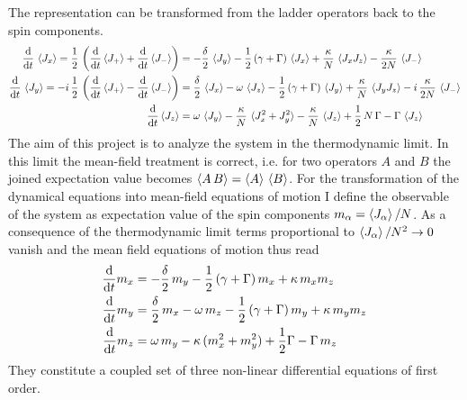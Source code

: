 The representation can be transformed from the ladder operators back to the spin components.
\begin{align*}
    \frac{\text{d}}{\text{d}t}\,\braket{J_x}=\frac{1}{2}\,\left(\frac{\text{d}}{\text{d}t} \braket{J_+}+\frac{\text{d}}{\text{d}t} \braket{J_-}\right)&=-\frac{\delta}{2}\,\braket{J_y}-\frac{1}{2}\,(\gamma+\Gamma)\,\braket{J_x}+\frac{\kappa}{N}\,\braket{J_xJ_z}-\frac{\kappa}{2N}\,\braket{J_-}\\
    \frac{\text{d}}{\text{d}t}\,\braket{J_y}=-i\,\frac{1}{2}\,\left(\frac{\text{d}}{\text{d}t} \braket{J_+}-\frac{\text{d}}{\text{d}t} \braket{J_-}\right)&=\frac{\delta}{2}\,\braket{J_x}-\omega\,\braket{J_z}-\frac{1}{2}\,(\gamma+\Gamma)\,\braket{J_y}+\frac{\kappa}{N}\,\braket{J_yJ_z}-i\,\frac{\kappa}{2N}\,\braket{J_-}\\
    \frac{\text{d}}{\text{d}t} \braket{J_z}&=\omega\,\braket{J_y} - \frac{\kappa}{N}\,\braket{J_x^2+J_y^2} -\frac{\kappa}{N}\,\braket{J_z}+\frac{1}{2}\,N\,\Gamma-\Gamma\,\braket{J_z}
\end{align*}
The aim of this project is to analyze the system in the thermodynamic limit. In this limit the mean-field treatment is correct, i.e. for two operators $A$ and $B$ the joined expectation value becomes $\braket{A\,B}=\braket{A}\,\braket{B}$. For the transformation of the dynamical equations into mean-field equations of motion I define the observable of the system as expectation value of the spin components $m_\alpha=\braket{J_\alpha}/N$. As a consequence of the thermodynamic limit terms proportional to $\braket{J_\alpha}/N^2\rightarrow0$ vanish and the mean field equations of motion thus read
\begin{align}
    \frac{\text{d}}{\text{d}t} m_x &= -\frac{\delta}{2}\,m_y-\frac{1}{2}\,(\gamma+\Gamma)\,m_x+\kappa\,m_x m_z\notag\\
    \frac{\text{d}}{\text{d}t} m_y &= \frac{\delta}{2}\,m_x-\omega\,m_z-\frac{1}{2}\,(\gamma+\Gamma)\,m_y+\kappa\,m_y m_z\notag\\
    \frac{\text{d}}{\text{d}t} m_z &= \omega\,m_y - \kappa\,(m_x^2+m_y^2)+\frac{1}{2}\Gamma-\Gamma\,m_z\label{eq:mean_field}
\end{align}
They constitute a coupled set of three non-linear differential equations of first order.

